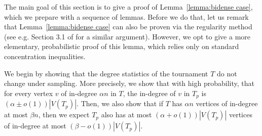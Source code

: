 \documentclass[a4paper,11pt]{article}
\theoremstyle{definition}
\begin{document}
The main goal of this section is to give a proof of Lemma~\ref{lemma:bidense case}, which we prepare with a sequence of lemmas. Before we do that, let us remark that Lemma~\ref{lemma:bidense case} can also be proven via the regularity method (see e.g. Section 3.1 of \cite{DKM} for a similar argument). However, we opt to give a more elementary, probabilistic proof of this lemma, which relies only on standard concentration inequalities.

We begin by showing that the degree statistics of the tournament $T$ do not change under sampling. More precisely, we show that with high probability, that for every vertex $v$ of in-degree $\alpha n$ in $T$, the in-degree of $v$ in $T_p$ is $(\alpha\pm o(1)) |V(T_p)|$. Then, we also show that if $T$ has $\alpha n$ vertices of in-degree at most $\beta n$, then we expect $T_p$ also has at most $(\alpha+o(1))|V(T_p)|$ vertices of in-degree at most $(\beta-o(1))|V(T_p)|$. 
\end{document}
